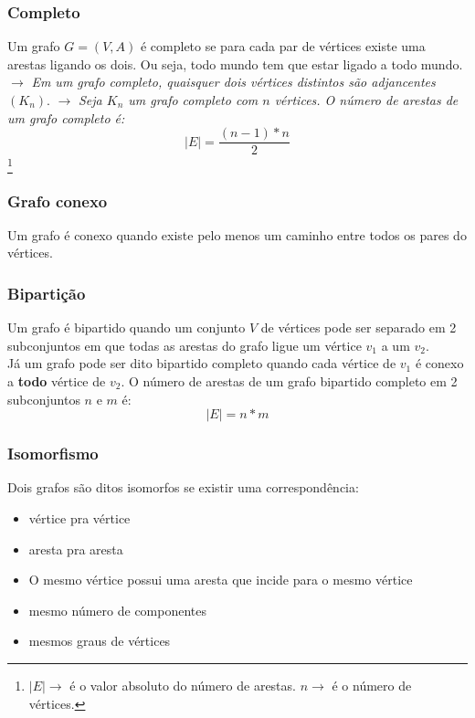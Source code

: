 \documentclass[12pt]{article}
\begin{document}
\subsubsection{Completo}
Um grafo $G = (V, A)$ é completo se para cada par de vértices existe uma arestas ligando os dois.
Ou seja, todo mundo tem que estar ligado a todo mundo.\\
$\longrightarrow$ \textit{Em um grafo completo, quaisquer dois vértices distintos são adjancentes $(K_n)$}.
$\longrightarrow$ \textit{Seja $K_n$ um grafo completo com $n$ vértices.
	O número de arestas de um grafo completo é:}\\

\begin{equation}
	|E| = \displaystyle\frac{(n - 1) * n}{2}
\end{equation}\footnote{
	$|E| \longrightarrow$ é o valor absoluto do número de arestas. $n \longrightarrow$ é o número de vértices.
}

\subsubsection{Grafo conexo}
Um grafo é conexo quando existe pelo menos um caminho entre todos os pares do vértices.

\subsubsection{Bipartição}
Um grafo é bipartido quando um conjunto $V$ de vértices pode ser separado em 2 subconjuntos em que todas as arestas do grafo ligue um vértice $v_1$ a um $v_2$.\\
Já um grafo pode ser dito bipartido completo quando cada vértice de $v_1$ é conexo a \textbf{todo} vértice de $v_2$.
O número de arestas de um grafo bipartido completo em 2 subconjuntos $n$ e $m$ é:
\begin{equation}
	|E| = n * m
\end{equation}

\subsubsection{Isomorfismo}
Dois grafos são ditos isomorfos se existir uma correspondência:

\begin{itemize}
	\item vértice pra vértice
	\item aresta pra aresta
	\item O mesmo vértice possui uma aresta que incide para o mesmo vértice
	\item mesmo número de componentes
	\item mesmos graus de vértices
\end{itemize}
\end{document}
